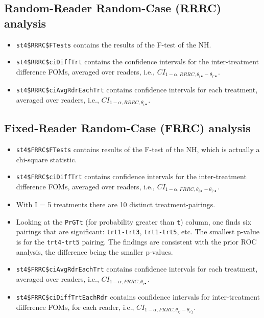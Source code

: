 \documentclass[
]{book}
\begin{document}
\hypertarget{or-applications-RRRC-dataset04-FROC-DBM}{%
\subsection{Random-Reader Random-Case (RRRC) analysis}\label{or-applications-RRRC-dataset04-FROC-DBM}}

\begin{itemize}
\item
  \texttt{st4\$RRRC\$FTests} contains the results of the F-test of the NH.
\item
  \texttt{st4\$RRRC\$ciDiffTrt} contains the confidence intervals for the inter-treatment difference FOMs, averaged over readers, i.e., \(CI_{1-\alpha,RRRC,\theta_{i \bullet} - \theta_{i' \bullet}}\).
\item
  \texttt{st4\$RRRC\$ciAvgRdrEachTrt} contains confidence intervals for each treatment, averaged over readers, i.e., \(CI_{1-\alpha,RRRC,\theta_{i \bullet}}\).
\end{itemize}

\hypertarget{or-applications-FRRC-dataset04-FROC-DBM}{%
\subsection{Fixed-Reader Random-Case (FRRC) analysis}\label{or-applications-FRRC-dataset04-FROC-DBM}}

\begin{itemize}
\item
  \texttt{st4\$FRRC\$FTests} contains results of the F-test of the NH, which is actually a chi-square statistic.
\item
  \texttt{st4\$FRRC\$ciDiffTrt} contains confidence intervals for the inter-treatment difference FOMs, averaged over readers, i.e., \(CI_{1-\alpha,FRRC,\theta_{i \bullet} - \theta_{i' \bullet}}\).
\item
  With I = 5 treatments there are 10 distinct treatment-pairings.
\item
  Looking at the \texttt{PrGTt} (for probability greater than \texttt{t}) column, one finds six pairings that are significant: \texttt{trt1-trt3}, \texttt{trt1-trt5}, etc. The smallest p-value is for the \texttt{trt4-trt5} pairing. The findings are consistent with the prior ROC analysis, the difference being the smaller p-values.
\item
  \texttt{st4\$FRRC\$ciAvgRdrEachTrt} contains confidence intervals for each treatment, averaged over readers, i.e., \(CI_{1-\alpha,FRRC,\theta_{i \bullet}}\).
\item
  \texttt{st4\$FRRC\$ciDiffTrtEachRdr} contains confidence intervals for inter-treatment difference FOMs, for each reader, i.e., \(CI_{1-\alpha,FRRC,\theta_{i j} - \theta_{i' j}}\).
\end{itemize}
\end{document}
